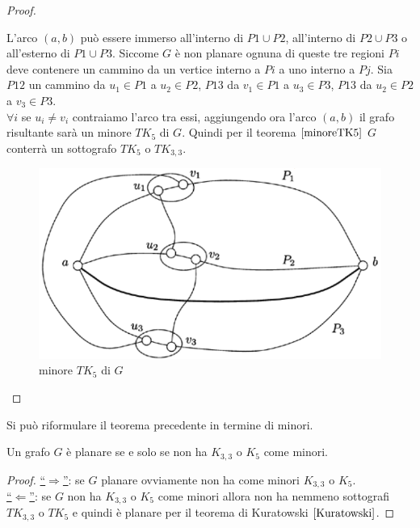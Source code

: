 \begin{teorema}
\begin{proof}
\begin{enumerate}
            L'arco \((a,b)\) può essere immerso all'interno di \(P1 \cup P2\), all'interno di \(P2 \cup P3\) o all'esterno di \(P1 \cup P3\). Siccome \(G\) è non planare ognuna di queste tre regioni \(Pi\) deve contenere un cammino da un vertice interno a \(Pi\) a uno interno a \(Pj\). Sia \(P12\) un cammino da \(u_1 \in P1\) a \(u_2 \in P2\), \(P13\) da \(v_1 \in P1\) a \(u_3 \in P3\), \(P13\) da \(u_2 \in P2\) a \(v_3 \in P3\).\\
            \(\forall i\) se \(u_i \neq v_i\) contraiamo l'arco tra essi, aggiungendo ora l'arco \((a,b)\) il grafo risultante sarà un minore \(TK_5\) di \(G\). Quindi per il teorema \(\ref{minoreTK5}\) \(G\) conterrà un sottografo \(TK_5\) o \(TK_{3,3}\).
            \begin{figure}[H]
                \centering
                \includegraphics[scale=0.6]{img/minoreTK5.PNG}
                \caption{minore \(TK_5\) di \(G\)}
            \end{figure}
        \end{enumerate}
    \end{proof}
\end{teorema}
\noindent Si può riformulare il teorema precedente in termine di minori.
\begin{teorema}
    Un grafo \(G\) è planare se e solo se non ha \(K_{3,3}\) o \(K_5\) come minori.
    \begin{proof}
        \underline{“\(\Rightarrow\)”}: se \(G\) planare ovviamente non ha come minori \(K_{3,3}\) o \(K_5\). \\
        \underline{“\(\Leftarrow\)”}: se \(G\) non ha \(K_{3,3}\) o \(K_5\) come minori allora non ha nemmeno sottografi \(TK_{3,3}\) o \(TK_5\) e quindi è planare per il teorema di Kuratowski \(\ref{Kuratowski}\).
    \end{proof}
\end{teorema}


